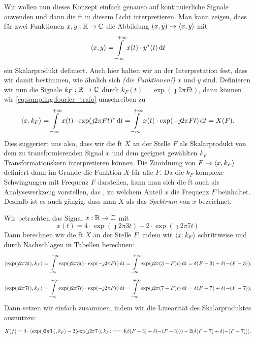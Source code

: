 Wir wollen nun dieses Konzept einfach genauso auf kontinuierliche Signale anwenden und dann die \gls{ft} in diesem Licht interpretieren.
Man kann zeigen, dass für zwei Funktionen $x,y : \mathbb{R} \rightarrow \mathbb{C}$ die Abbildung $(x,y) \mapsto {\left\langle x,y \right\rangle}$ mit
%
\begin{equation}\label{eq:cont_scpr}
    {\left\langle x,y \right\rangle} = {\int\limits_{-\infty}^{+\infty}{
        x(t) \cdot y^\ast(t)
    }\,\mathrm{d}{t}}
\end{equation}
%
ein Skalarprodukt definiert. 
Auch hier halten wir an der Interpretation fest, dass wir damit bestimmen, wie ähnlich sich \emph{(die Funktionen!)} $x$ und $y$ sind.
Definieren wir nun die Signale $k_F: \mathbb{R} \rightarrow \mathbb{C}$ durch $k_F(t) = \exp(\jmath 2 \pi F t)$, dann können wir \eqref{eq:sampling:fourier_trafo} umschreiben zu
\[
{\left\langle x,k_F \right\rangle} 
    = {\int\limits_{-\infty}^{+\infty}{
        x(t) \cdot \exp(\jmath 2 \pi F t)^\ast
    }\,\mathrm{d}{t}}
    = {\int\limits_{-\infty}^{+\infty}{
        x(t) \cdot \exp(-\jmath 2 \pi F t)
    }\,\mathrm{d}{t}}
    = X(F).
\]
Dies suggeriert uns also, dass wir die \gls{ft} $X$ an der Stelle $F$ als Skalarprodukt von dem zu transformierenden Signal $x$ und dem geeignet gewählten $k_F$ Transformationskern interpretieren können.
Die Zuordnung von $F \mapsto {\left\langle x,k_F \right\rangle}$ definiert dann im Grunde die Funktion $X$ für alle $F$.
Da die $k_F$ komplexe Schwingungen mit Frequenz $F$ darstellen, kann man sich die \gls{ft} auch als Analysewerkzeug vorstellen, das , zu welchem Anteil $x$ die Frequenz $F$ beinhaltet.
Deshalb ist es auch gängig, dass man $X$ als das \emph{Spektrum} von $x$ bezeichnet.
%
\begin{Bsp}
Wir betrachten das Signal $x: \mathbb{R} \rightarrow \mathbb{C}$ mit 
\[
x(t) = 4 \cdot \exp(\jmath 2 \pi 3 t) - 2 \cdot \exp(\jmath 2 \pi 7 t)
\]
Dann berechnen wir die \gls{ft} $X$ an der Stelle $F$, indem wir ${\left\langle x,k_F \right\rangle}$ schrittweise und durch Nachschlagen in Tabellen berechnen:
\[
{\left\langle \exp(\jmath 2 \pi 3 t),k_F \right\rangle} 
    = {\int\limits_{-\infty}^{+\infty}{
        \exp(\jmath 2 \pi 3 t) \cdot \exp(-\jmath 2 \pi F t)
    }\,\mathrm{d}{t}}
    = {\int\limits_{-\infty}^{+\infty}{
        \exp(\jmath 2 \pi (3 - F) t)
    }\,\mathrm{d}{t}}
    = \delta(F - 3) + \delta(-(F - 3)),
\]
\[
{\left\langle \exp(\jmath 2 \pi 7 t),k_F \right\rangle} 
    = {\int\limits_{-\infty}^{+\infty}{
        \exp(\jmath 2 \pi 7 t) \cdot \exp(-\jmath 2 \pi F t)
    }\,\mathrm{d}{t}}
    = {\int\limits_{-\infty}^{+\infty}{
        \exp(\jmath 2 \pi (7 - F) t)
    }\,\mathrm{d}{t}}
    = \delta(F - 7) + \delta(-(F - 7)),
\]
Dann setzen wir einfach zusammen, indem wir die Linearität des Skalarproduktes ausnutzen:
\[
X(f) 
    = 4 \cdot {\left\langle \exp(\jmath 2 \pi 3 \cdot),k_F \right\rangle} - 2 {\left\langle \exp(\jmath 2 \pi 7 \cdot),k_F \right\rangle} = 
    = 4 (\delta(F - 3) + \delta(-(F - 3))) - 2 (\delta(F - 7) + \delta(-(F - 7))).
\]
\end{Bsp}


